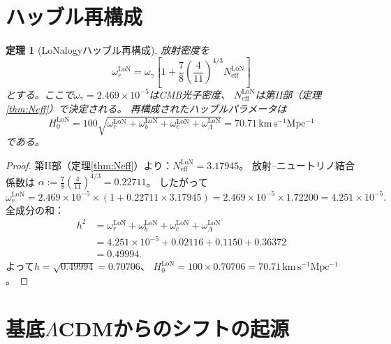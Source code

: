 \documentclass[12pt]{article}
\theoremstyle{plain}
\newtheorem{theorem}{定理}[section]
\theoremstyle{definition}
\numberwithin{equation}{section}
\newcommand{\eff}{\mathrm{eff}}
\newcommand{\LoN}{\mathrm{LoN}}
\begin{document}
\section{ハッブル再構成}\label{sec:H0recon}

\begin{theorem}[LoNalogyハッブル再構成]\label{thm:H0}
放射密度を
\begin{equation}
\omega_r^{\LoN} = \omega_\gamma\left[1+\frac{7}{8}\left(\frac{4}{11}\right)^{4/3}N_{\eff}^{\LoN}\right]
\end{equation}
とする。ここで$\omega_\gamma=2.469\times10^{-5}$はCMB光子密度、
$N_{\eff}^{\LoN}$は第II部（定理\ref{thm:Neff}）で決定される。
再構成されたハッブルパラメータは
\begin{equation}
\boxed{H_0^{\LoN} = 100\sqrt{\omega_r^{\LoN}+\omega_b^{\LoN}+\omega_c^{\LoN}+\omega_\Lambda^{\LoN}}
= 70.71\,\mathrm{km\,s^{-1}Mpc^{-1}}}
\end{equation}
である。
\end{theorem}

\begin{proof}
第II部（定理\ref{thm:Neff}）より：$N_{\eff}^{\LoN}=3.17945$。
放射--ニュートリノ結合係数は
$\alpha:=\frac{7}{8}\left(\frac{4}{11}\right)^{4/3}=0.22711$。
したがって
\begin{equation}
\omega_r^{\LoN} = 2.469\times10^{-5}\times(1+0.22711\times3.17945)
= 2.469\times10^{-5}\times1.72200
= 4.251\times10^{-5}.
\end{equation}
全成分の和：
\begin{align}
h^2 &= \omega_r^{\LoN}+\omega_b^{\LoN}+\omega_c^{\LoN}+\omega_\Lambda^{\LoN}\\
&= 4.251\times10^{-5}+0.02116+0.1150+0.36372\\
&= 0.49994.
\end{align}
よって$h=\sqrt{0.49994}=0.70706$、
$H_0^{\LoN}=100\times0.70706=70.71\,\mathrm{km\,s^{-1}Mpc^{-1}}$。
\end{proof}


\section{基底$\Lambda$CDMからのシフトの起源}\label{sec:shift}
\end{document}
